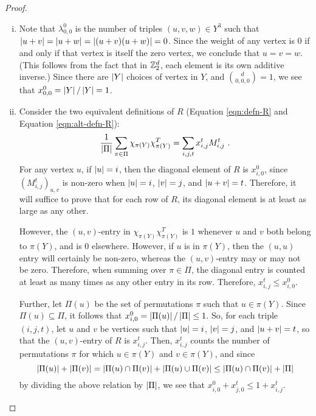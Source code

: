 \documentclass{report}
\newcommand{\wt}[1]{\abs{ #1 }}
\newcommand{\xijt}{x_{i, j}^t}
\newcommand{\Mijt}{M_{i, j}^t}
\newcommand{\chipiY}{\chi_{\pi(Y)}}
\begin{document}
    \begin{proof} \begin{enumerate}[(i)]
      \item Note that $\lambda_{0, 0}^0$ is the number of triples $(u, v, w)
        \in Y^3$ such that $\wt{u + v} = \wt{u + w} = \wt{(u + v)(u + w)} =
        0$.  Since the weight of any vertex is $0$ if and only if that vertex
        is itself the zero vertex, we conclude that $u = v = w$.  (This
        follows from the fact that in $\mathbb{Z}_2^d$, each element is its own
        additive inverse.)  Since there are $\left\lvert Y \right\rvert$ choices of vertex in
        $Y$, and $\binom{d}{0, 0, 0} = 1$, we see that $x_{0, 0}^0 = \left\lvert Y \right\rvert /
        \left\lvert Y \right\rvert = 1$.

      \item Consider the two equivalent definitions of $R$ (Equation
        \ref{eqn:defn-R} and Equation \ref{eqn:alt-defn-R}):
        $$
          \frac{1}{\abs{\Pi}} \sum_{\pi \in \Pi} \chipiY \chipiY^T
          = \sum_{i, j, t} \xijt \Mijt \ .
        $$
        For any vertex $u$, if $\wt{u} = i$, then the diagonal element of $R$ is
        $x_{i, 0}^0$, since $(\Mijt)_{u, v}$ is non-zero when $\wt{u} = i$,
        $\wt{v} = j$, and $\wt{u + v} = t$.  Therefore, it will suffice to prove
        that for each row of $R$, its diagonal element is at least as large as
        any other.

        However, the $(u, v)$-entry in $\chipiY \chipiY^T$ is $1$ whenever $u$
        and $v$ both belong to $\pi(Y)$, and is $0$ elsewhere.  However, if $u$
        is in $\pi(Y)$, then the $(u, u)$ entry will certainly be non-zero,
        whereas the $(u, v)$-entry may or may not be zero.  Therefore, when
        summing over $\pi \in \Pi$, the diagonal entry is counted at least as
        many times as any other entry in its row.  Therefore, $\xijt \leq x_{i,
        0}^0$.  

        Further, let $\Pi(u)$ be the set of permutations $\pi$ such that $u \in
        \pi(Y)$.  Since $\Pi(u) \subseteq \Pi$, it follows that $x_{i, 0}^0 =
        \left\lvert \Pi(u) \right\rvert / \left\lvert \Pi \right\rvert \leq 1$.  So, for each triple $(i, j, t)$, let
        $u$ and $v$ be vertices such that $\wt{u} = i$, $\wt{v} = j$, and $\wt{u
        + v} = t$, so that the $(u, v)$-entry of $R$ is $\xijt$.  Then, $\xijt$
        counts the number of permutations $\pi$ for which $u \in \pi(Y)$ and $v
        \in \pi(Y)$, and since
        $$
          \left\lvert \Pi(u) \right\rvert + \left\lvert \Pi(v) \right\rvert
          = \left\lvert \Pi(u) \cap \Pi(v) \right\rvert
          + \left\lvert \Pi(u) \cup \Pi(v) \right\rvert
          \leq \left\lvert \Pi(u) \cap \Pi(v) \right\rvert
          + \left\lvert \Pi \right\rvert
        $$
        by dividing the above relation by $\left\lvert \Pi \right\rvert$, we see that $x_{i, 0}^0 +
        x_{j, 0}^t \leq 1 + \xijt$.


\end{enumerate}
\end{proof}
\end{document}
